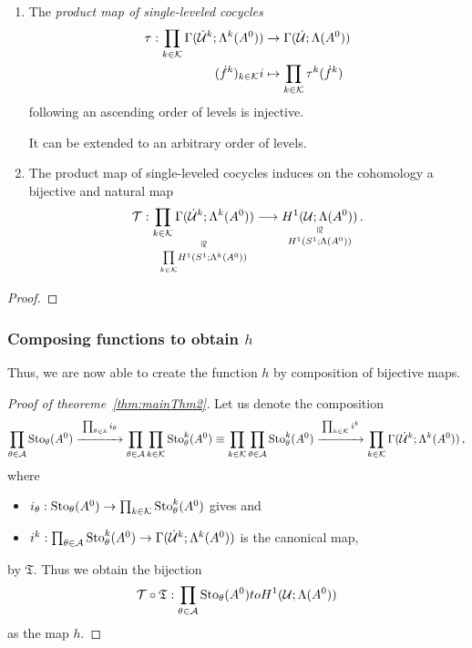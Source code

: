 \begin{cor}
  \begin{enumerate}
    \item The \emph{product map of single-leveled cocycles}
      \begin{align*}
        \tau:\prod_{k\in\mathcal{K}}\Gamma(\dot {\mathcal{U}}^k;\Lambda^k(A^0))
        &\to
        \Gamma(\dot{\mathcal{U}};\Lambda(A^0))
      \\(\dot f^k)_{k\in\mathcal{K}}i
        &\mapsto
        \prod_{k\in\mathcal{K}}\tau^k(\dot f^k)
      \end{align*}
      following an ascending order of levels is injective.
      \begin{rem}
        It can be extended to an arbitrary order of levels.
      \end{rem}
    \item The product map of single-leveled cocycles induces on the cohomology
      a bijective and natural map
      \[
        \cT:
        \underset{\underset{k\in\cK}\prod H^1(S^1;\Lambda^k(A^0))}{%
          \underset{\text{\rotatebox[origin=c]{-90}{$\cong$}}}{%
            \prod_{k\in\cK}\Gamma(\dot\cU^k;\Lambda^k(A^0))}}
        \longrightarrow
        \underset{H^1(S^1;\Lambda(A^0))}{%
          \underset{\text{\rotatebox[origin=c]{-90}{$\cong$}}}{%
            H^1(\cU;\Lambda(A^0))}}\,.
      \]
  \end{enumerate}
\end{cor}
\begin{proof}
  \TODO{}
\end{proof}
\subsubsection{Composing functions to obtain $h$}
Thus, we are now able to create the function $h$ by composition of bijective
maps.
\begin{proof}[Proof of theoreme~\ref{thm:mainThm2}]
  Let us denote the composition
  \[
    \prod_{\theta\in\mathcal{A}}\operatorname{Sto}_\theta(A^0)
    \overset{\prod_{\theta\in\mathbb{A}}i_\theta}{\xrightarrow{\hspace*{1.2cm}}}
    \prod_{\theta\in\mathcal{A}}\prod_{k\in\mathcal{K}}\operatorname{Sto}_\theta^k(A^0)
    \equiv
    \prod_{k\in\mathcal{K}}\prod_{\theta\in\mathcal{A}}\operatorname{Sto}_\theta^k(A^0)
    \overset{\prod_{k\in\mathcal{K}}i^k}{\xrightarrow{\hspace*{1.2cm}}}
    \prod_{k\in\mathcal{K}}\Gamma(\dot{\mathcal{U}}^k;\Lambda^k(A^0))
    \,,
  \]
  where
  \begin{itemize}
    \item $i_\theta:\operatorname{Sto}_\theta(A^0)\to\prod_{k\in\mathcal{K}}\operatorname{Sto}_\theta^k(A^0)$ gives
      \TODO{} and
    \item $i^k:\prod_{\theta\in\mathcal{A}}\operatorname{Sto}_\theta^k(A^0)
      \to\Gamma(\dot{\mathcal{U}}^k;\Lambda^k(A^0))$ is the canonical map,
  \end{itemize}
  by $\mathfrak{T}$. Thus we obtain the bijection
  \[
    \mathcal{T}\circ\mathfrak{T}:
    \prod_{\theta\in\mathcal{A}}\operatorname{Sto}_\theta(A^0)
    to
    H^1(\mathcal{U};\Lambda(A^0))
  \]
  as the map $h$.
\end{proof}
